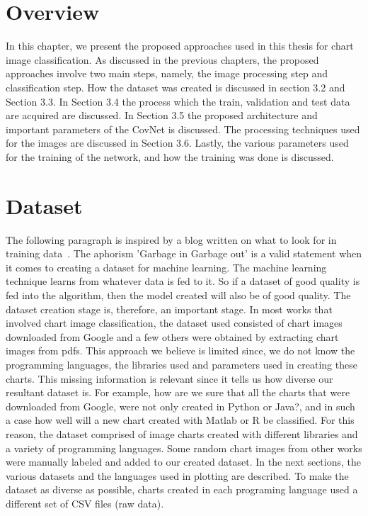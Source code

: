 \documentclass[12pt, a4paper,oneside]{report}
\begin{document}
\section{Overview}
In this chapter, we present the proposed approaches used in this thesis for chart image classification. As discussed in the previous chapters, the proposed approaches involve two main steps, namely, the image processing step and classification step. How the dataset was created is discussed in section 3.2 and Section 3.3. In Section 3.4 the process which the train, validation and test data are acquired are discussed. In Section 3.5 the proposed architecture and important parameters of the CovNet is discussed. The processing techniques used for the images are discussed in Section 3.6. Lastly, the various parameters used for the training of the network, and how the training was done is discussed.

\section{Dataset}
The following paragraph is inspired by a blog written on what to look for in training data~\cite{edi}.
The aphorism 'Garbage in Garbage out' is a valid statement when it comes to creating a dataset for machine learning. The machine learning technique learns from whatever data is fed to it. So if a dataset of good quality is fed into the algorithm, then the model created will also be of good quality. The dataset creation stage is, therefore, an important stage. In most works that involved chart image classification, the dataset used consisted of chart images downloaded from Google and a few others were obtained by extracting chart images from pdfs. This approach we believe is limited since, we do not know the programming languages, the libraries used and parameters used in creating these charts. This missing information is relevant since it tells us how diverse our resultant dataset is. For example, how are we sure that all the charts that were downloaded from Google, were not only created in Python or Java?, and in such a case how well will a new chart created with Matlab or R be classified. For this reason, the dataset comprised of image charts created with different libraries and a variety of programming languages. Some random chart images from other works were manually labeled and added to our created dataset. In the next sections, the various datasets and the languages used in plotting are described. To make the dataset as diverse as possible, charts created in each programing language used a different set of CSV files (raw data). 
\end{document}
